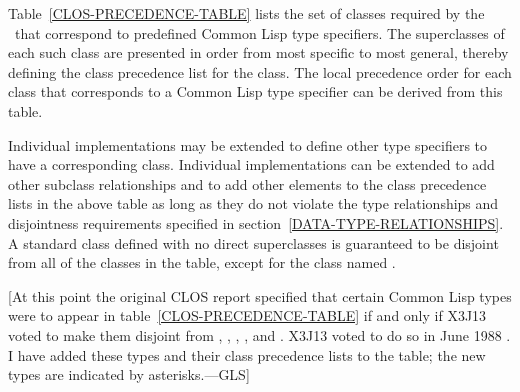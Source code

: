 Table~\ref{CLOS-PRECEDENCE-TABLE} lists the set of classes required by the \OS\
that correspond to predefined Common Lisp type specifiers.  The
superclasses of each such class are presented in order from most
specific to most general, thereby defining the class precedence list
for the class. The local precedence order for each class that
corresponds to a Common Lisp type specifier can be derived from this
table.

Individual implementations may be extended to define other type
specifiers to have a corresponding class.  Individual implementations
can be extended to add other subclass relationships and to add other
elements to the class precedence lists in the above table as long as
they do not violate the type relationships and disjointness
requirements specified in section~\ref{DATA-TYPE-RELATIONSHIPS}.
A standard class defined with no direct superclasses is guaranteed to
be disjoint from all of the classes in the table, except for the
class named \cdf{t}.

[At this point the original CLOS report specified that certain Common Lisp
types were to appear in table~\ref{CLOS-PRECEDENCE-TABLE} if and only if
X3J13 voted to make them disjoint from
, , , , and .
X3J13 voted to do so in June 1988
.  I have added these types
and their class precedence lists to the table; the new types are indicated
by asterisks.---GLS]


